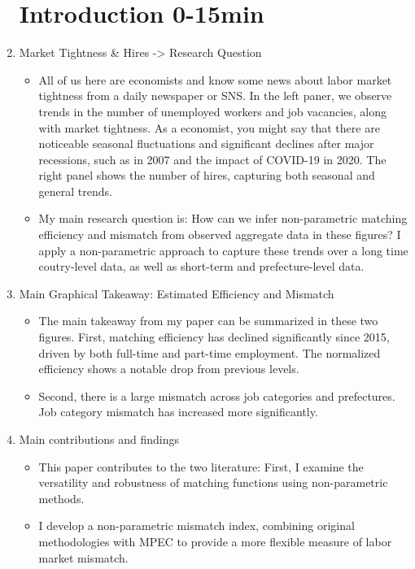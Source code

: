 \documentclass[12pt]{article}
\begin{document}
\begin{enumerate}
\section{Introduction 0-15min}
    \item Market Tightness \& Hires -> Research Question
    \begin{itemize}
        \item All of us here are economists and know some news about labor market tightness from a daily newspaper or SNS. In the left paner, we observe trends in the number of unemployed workers and job vacancies, along with market tightness. As a economist, you might say that there are noticeable seasonal fluctuations and significant declines after major recessions, such as in 2007 and the impact of COVID-19 in 2020. The right panel shows the number of hires, capturing both seasonal and general trends.
        \item My main research question is: How can we infer non-parametric matching efficiency and mismatch from observed aggregate data in these figures? I apply a non-parametric approach to capture these trends over a long time coutry-level data, as well as short-term and prefecture-level data.
    \end{itemize}
    \item Main Graphical Takeaway: Estimated Efficiency and Mismatch
    \begin{itemize}
        \item The main takeaway from my paper can be summarized in these two figures. First, matching efficiency has declined significantly since 2015, driven by both full-time and part-time employment. The normalized efficiency shows a notable drop from previous levels.
        \item Second, there is a large mismatch across job categories and prefectures. Job category mismatch has increased more significantly.
    \end{itemize}
    \item Main contributions and findings
    \begin{itemize}
        \item This paper contributes to the two literature:
        First, I examine the versatility and robustness of matching functions using non-parametric methods.
        \item I develop a non-parametric mismatch index, combining original methodologies with MPEC to provide a more flexible measure of labor market mismatch.

\end{itemize}
\end{enumerate}
\end{document}
